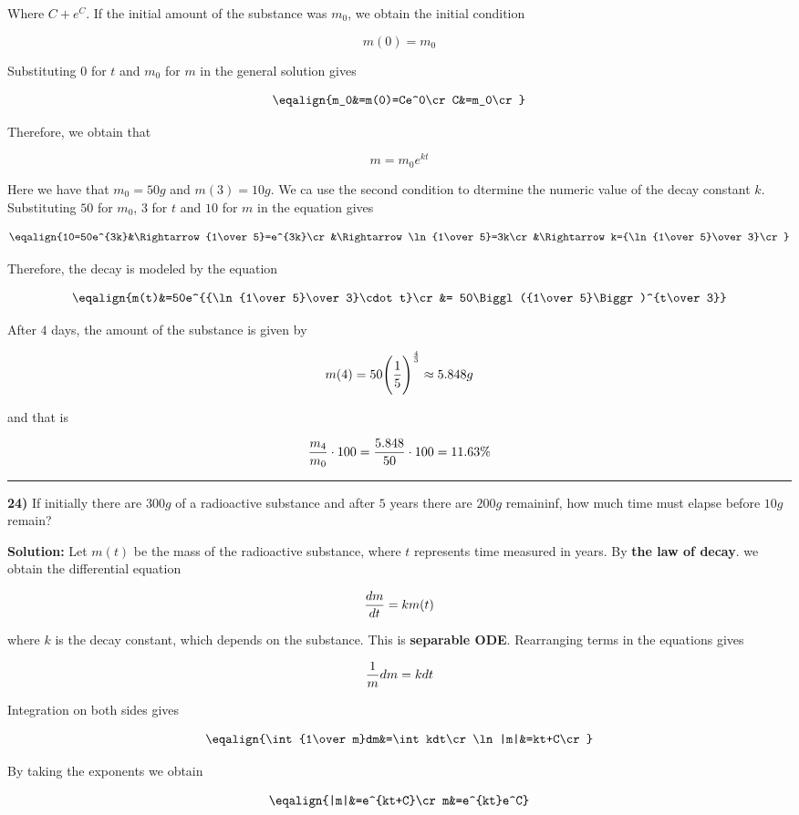 Where $C+e^C$. If the initial amount of the substance was $m_0$, we obtain the initial condition

$$m(0)=m_0$$

Substituting $0$ for $t$ and $m_0$ for $m$ in the general solution gives

$$\eqalign{m_0&=m(0)=Ce^0\cr
	C&=m_0\cr}$$

Therefore, we obtain that

$$m=m_0e^{kt}$$

Here we have that $m_0=50g$ and $m(3)=10g$. We ca use the second condition to dtermine the numeric value of the decay constant $k$. Substituting $50$ for $m_0$, $3$ for $t$ and $10$ for $m$ in the equation gives

$$\eqalign{10=50e^{3k}&\Rightarrow{1\over 5}=e^{3k}\cr
	&\Rightarrow \ln{1\over 5}=3k\cr
	&\Rightarrow k={\ln{1\over 5}\over 3}\cr}$$

Therefore, the decay is modeled by the equation

$$\eqalign{m(t)&=50e^{{\ln{1\over 5}\over 3}\cdot t}\cr
	&= 50\Biggl({1\over 5}\Biggr)^{t\over 3}}$$

After $4$ days, the amount of the substance is given by 

$$m(4)=50\Biggl({1\over 5}\Biggr)^{4\over 3}\approx 5.848g$$

and that is

$${m_4\over m_0}\cdot 100={5.848\over 50}\cdot 100=11.63\%$$

\vskip 1mm
\hrule

\vskip 1cm
{\bf 24)} If initially there are $300g$ of a radioactive substance and after $5$ years there are $200g$ remaininf, how much time must elapse before $10g$ remain?

\vskip 1cm
{\bf Solution:} Let $m(t)$ be the mass of the radioactive substance, where $t$ represents time measured in years. By {\bf the law of decay}. we obtain the differential equation

$${dm\over dt}=km(t)$$

where $k$ is the decay constant, which depends on the substance. This is {\bf separable ODE}. Rearranging terms in the equations gives

$${1\over m}dm=kdt$$

Integration on both sides gives

$$\eqalign{\int{1\over m}dm&=\int kdt\cr
		\ln|m|&=kt+C\cr}$$

By taking the exponents we obtain

$$\eqalign{|m|&=e^{kt+C}\cr
	m&=e^{kt}e^C}$$

